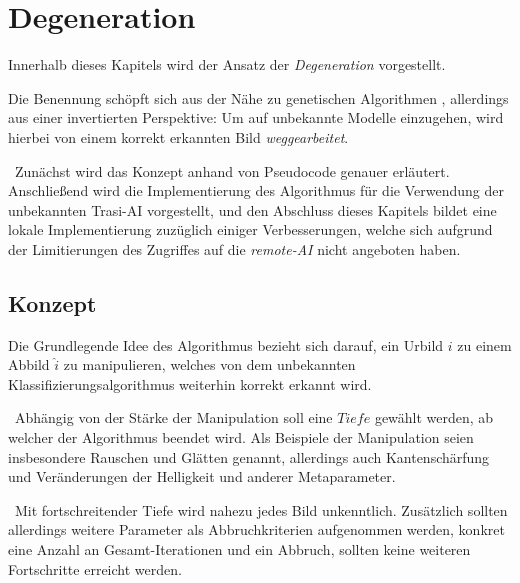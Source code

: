 \chapter{Degeneration}
\label{cha:Degeneration}
Innerhalb dieses Kapitels wird der Ansatz der \textit{Degeneration} vorgestellt.

Die Benennung schöpft sich aus der Nähe zu genetischen Algorithmen , allerdings aus einer invertierten Perspektive: Um auf unbekannte Modelle einzugehen, wird hierbei von einem korrekt erkannten Bild \textit{weggearbeitet}.

~\newline Zunächst wird das Konzept anhand von Pseudocode genauer erläutert. Anschließend wird die Implementierung des Algorithmus für die Verwendung der unbekannten Trasi-AI vorgestellt, und den Abschluss dieses Kapitels bildet eine lokale Implementierung zuzüglich einiger Verbesserungen, welche sich aufgrund der Limitierungen des Zugriffes auf die \textit{remote-AI} nicht angeboten haben.
\section{Konzept}
\label{sec:DegenerationKonzept}
Die Grundlegende Idee des Algorithmus bezieht sich darauf, ein Urbild $i$ zu einem Abbild $\hat{i}$ zu manipulieren, welches von dem unbekannten Klassifizierungsalgorithmus weiterhin korrekt erkannt wird. 

~\newline Abhängig von der Stärke der Manipulation soll eine $Tiefe$ gewählt werden, ab welcher der Algorithmus beendet wird. Als Beispiele der Manipulation seien insbesondere Rauschen und Glätten genannt, allerdings auch Kantenschärfung und Veränderungen der Helligkeit und anderer Metaparameter. 

~\newline Mit fortschreitender Tiefe wird nahezu jedes Bild unkenntlich. Zusätzlich sollten allerdings weitere Parameter als Abbruchkriterien aufgenommen werden, konkret eine Anzahl an Gesamt-Iterationen und ein Abbruch, sollten keine weiteren Fortschritte erreicht werden.

\newpage
